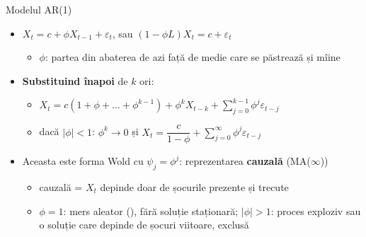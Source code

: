 \begin{frame}{Modelul AR(1)}
\itemsize{\small}
\begin{itemize}
    \item $X_t = c + \phi X_{t-1} + \varepsilon_t$, sau $(1 - \phi L)X_t = c + \varepsilon_t$
    \begin{itemize}
        \item $\phi$: partea din abaterea de azi față de medie care se păstrează și mîine
    \end{itemize}
    \item \textbf{Substituind înapoi} de $k$ ori:
    \begin{itemize}
        \item $X_t = c(1 + \phi + \dots + \phi^{k-1}) + \phi^kX_{t-k} + \sum_{j=0}^{k-1}\phi^j\varepsilon_{t-j}$
        \item dacă $|\phi| < 1$: $\phi^k \to 0$ și $X_t = \dfrac{c}{1 - \phi} + \sum_{j=0}^{\infty}\phi^j\varepsilon_{t-j}$
    \end{itemize}
    \item Aceasta este forma Wold cu $\psi_j = \phi^j$: reprezentarea \textbf{cauzală} (MA($\infty$))
    \begin{itemize}
        \item cauzală = $X_t$ depinde doar de șocurile prezente și trecute
        \item $\phi = 1$: mers aleator (), fără soluție staționară; $|\phi| > 1$: proces exploziv sau o soluție care depinde de șocuri viitoare, exclusă
    \end{itemize}
\end{itemize}
\end{frame}

